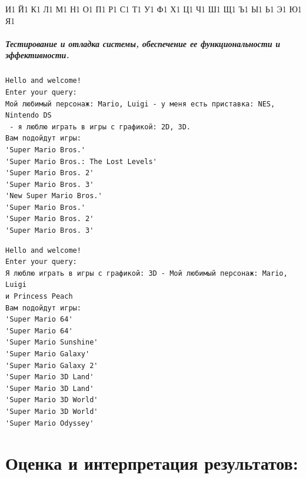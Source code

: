 \documentclass[12pt,onecolumn]{article}
\begin{document}
{          {И}{{\selectfont{}}}1
          {Й}{{\selectfont{}}}1
          {К}{{\selectfont{}}}1
          {Л}{{\selectfont{}}}1
          {М}{{\selectfont{}}}1
          {Н}{{\selectfont{}}}1
          {О}{{\selectfont{}}}1
          {П}{{\selectfont{}}}1
          {Р}{{\selectfont{}}}1
          {С}{{\selectfont{}}}1
          {Т}{{\selectfont{}}}1
          {У}{{\selectfont{}}}1
          {Ф}{{\selectfont{}}}1
          {Х}{{\selectfont{}}}1
          {Ц}{{\selectfont{}}}1
          {Ч}{{\selectfont{}}}1
          {Ш}{{\selectfont{}}}1
          {Щ}{{\selectfont{}}}1
          {Ъ}{{\selectfont{}}}1
          {Ы}{{\selectfont{}}}1
          {Ь}{{\selectfont{}}}1
          {Э}{{\selectfont{}}}1
          {Ю}{{\selectfont{}}}1
          {Я}{{\selectfont{}}}1
}


\subparagraph{Тестирование и отладка системы, обеспечение ее функциональности и эффективности.}
\begin{verbatim}
Hello and welcome!
Enter your query: 
Мой любимый персонаж: Mario, Luigi - у меня есть приставка: NES, Nintendo DS
 - я люблю играть в игры с графикой: 2D, 3D.
Вам подойдут игры: 
'Super Mario Bros.'
'Super Mario Bros.: The Lost Levels'
'Super Mario Bros. 2'
'Super Mario Bros. 3'
'New Super Mario Bros.'
'Super Mario Bros.'
'Super Mario Bros. 2'
'Super Mario Bros. 3'
\end{verbatim}
\begin{verbatim}
Hello and welcome!
Enter your query: 
Я люблю играть в игры с графикой: 3D - Мой любимый персонаж: Mario, Luigi 
и Princess Peach
Вам подойдут игры: 
'Super Mario 64'
'Super Mario 64'
'Super Mario Sunshine'
'Super Mario Galaxy'
'Super Mario Galaxy 2'
'Super Mario 3D Land'
'Super Mario 3D Land'
'Super Mario 3D World'
'Super Mario 3D World'
'Super Mario Odyssey'
\end{verbatim}
\section{Оценка и интерпретация результатов:}
\end{document}
